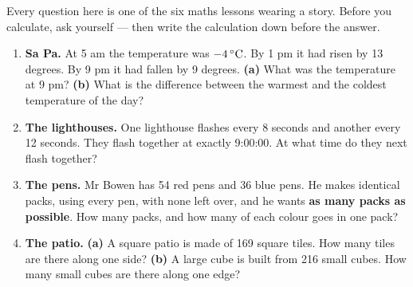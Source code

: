 \documentclass[12pt,a4paper]{article}
\begin{document}

\noindent Every question here is one of the six maths lessons wearing a story. Before
you calculate, ask yourself  --- then write the calculation
down before the answer.

\vspace{4pt}
\begin{enumerate}[label=\textbf{\arabic*.}, itemsep=11pt]

  \item \textbf{Sa Pa.} At 5 am the temperature was $-4\,^{\circ}\mathrm{C}$. By 1 pm it had risen by
        13 degrees. By 9 pm it had fallen by 9 degrees.
        \textbf{(a)} What was the temperature at 9 pm?
        \textbf{(b)} What is the difference between the warmest and the coldest
        temperature of the day?
        \begin{workspace}[2.2cm]\end{workspace}

  \item \textbf{The lighthouses.} One lighthouse flashes every 8 seconds and another
        every 12 seconds. They flash together at exactly 9:00:00. At what time do
        they next flash together?
        \begin{workspace}[2.2cm]\end{workspace}

  \item \textbf{The pens.} Mr Bowen has 54 red pens and 36 blue pens. He makes
        identical packs, using every pen, with none left over, and he wants
        \textbf{as many packs as possible}. How many packs, and how many of each
        colour goes in one pack?
        \begin{workspace}[2.2cm]\end{workspace}

  \item \textbf{The patio.} \textbf{(a)} A square patio is made of 169 square tiles.
        How many tiles are there along one side?
        \textbf{(b)} A large cube is built from 216 small cubes. How many small
        cubes are there along one edge?
        \begin{workspace}[2.2cm]\end{workspace}


\end{enumerate}
\end{document}
